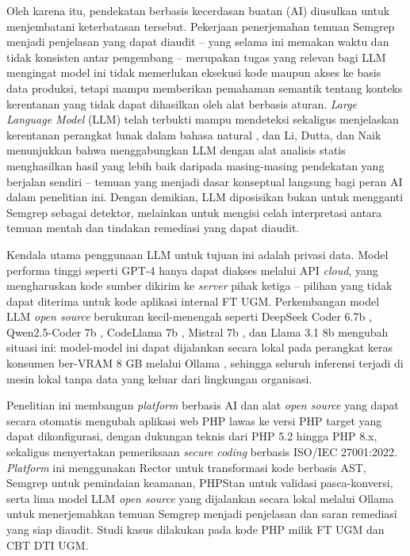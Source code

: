 Oleh karena itu, pendekatan berbasis kecerdasan buatan (AI) diusulkan untuk menjembatani keterbatasan tersebut. Pekerjaan penerjemahan temuan 
Semgrep menjadi penjelasan yang dapat diaudit -- yang selama ini memakan 
waktu dan tidak konsisten antar pengembang -- merupakan tugas yang relevan bagi LLM mengingat model ini tidak memerlukan eksekusi kode maupun akses ke basis data produksi, tetapi mampu memberikan pemahaman semantik 
tentang konteks kerentanan yang tidak dapat dihasilkan oleh 
alat berbasis aturan. \textit{Large Language Model} (LLM) telah terbukti 
mampu mendeteksi sekaligus menjelaskan kerentanan perangkat lunak dalam 
bahasa natural \cite{akuthota2023vulnerability}\cite{li2025software}, 
dan Li, Dutta, dan Naik \cite{li2025iris} menunjukkan bahwa menggabungkan 
LLM dengan alat analisis statis menghasilkan hasil yang lebih baik 
daripada masing-masing pendekatan yang berjalan sendiri -- temuan yang 
menjadi dasar konseptual langsung bagi peran AI dalam penelitian ini. 
Dengan demikian, LLM diposisikan bukan untuk mengganti Semgrep sebagai 
detektor, melainkan untuk mengisi celah interpretasi antara temuan 
mentah dan tindakan remediasi yang dapat diaudit.

Kendala utama penggunaan LLM untuk tujuan ini adalah privasi data. 
Model performa tinggi seperti GPT-4 hanya dapat diakses melalui API 
\textit{cloud}, yang mengharuskan kode sumber dikirim ke \textit{server} 
pihak ketiga -- pilihan yang tidak dapat diterima untuk kode aplikasi 
internal FT UGM. Perkembangan model LLM \textit{open source} berukuran 
kecil-menengah seperti DeepSeek Coder 6.7b \cite{deepseek2024coder}, 
Qwen2.5-Coder 7b \cite{hui2024qwen}, CodeLlama 7b 
\cite{roziere2024codellama}, Mistral 7b \cite{jiang2023mistral}, dan 
Llama 3.1 8b \cite{dubey2024llama3} mengubah situasi ini: model-model 
ini dapat dijalankan secara lokal pada perangkat keras konsumen 
ber-VRAM 8 GB melalui Ollama \cite{ollama2024}, sehingga seluruh 
inferensi terjadi di mesin lokal tanpa data yang keluar dari lingkungan 
organisasi.

Penelitian ini membangun \textit{platform} berbasis AI dan alat 
\textit{open source} yang dapat secara otomatis mengubah aplikasi web 
PHP lawas ke versi PHP target yang dapat dikonfigurasi, dengan dukungan 
teknis dari PHP 5.2 hingga PHP 8.x, sekaligus menyertakan pemeriksaan 
\textit{secure coding} berbasis ISO/IEC 27001:2022. \textit{Platform} 
ini menggunakan Rector \cite{rector2024} untuk transformasi kode berbasis 
AST, Semgrep \cite{semgrep2024} untuk pemindaian keamanan, PHPStan 
\cite{phpstan2024} untuk validasi pasca-konversi, serta lima model LLM 
\textit{open source} yang dijalankan secara lokal melalui Ollama 
\cite{ollama2024} untuk menerjemahkan temuan Semgrep menjadi penjelasan 
dan saran remediasi yang siap diaudit. Studi kasus dilakukan pada kode 
PHP milik FT UGM dan CBT DTI UGM.

